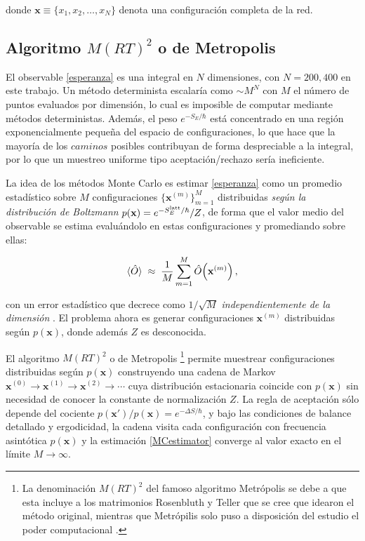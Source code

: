 \documentclass[11pt,a4paper,twoside,pdf]{article}
\numberwithin{equation}{section}
\begin{document}
donde $\mathbf{x} \equiv \{x_1, x_2, \ldots, x_N\}$ denota una configuración completa de la red.





\subsection{Algoritmo $M(RT)^2$ o de Metropolis}
\label{metropolis}


El observable \ref{esperanza} es una integral en $N$ dimensiones, con $N = 200, 400$ en este trabajo. Un método determinista escalaría como $\sim M^N$ con $M$ el número de puntos evaluados por dimensión, lo cual es imposible de computar mediante métodos deterministas. Además, el peso $e^{-S_E/\hbar}$ está concentrado en una región exponencialmente pequeña del espacio de configuraciones, lo que hace que la mayoría de los $caminos$ posibles contribuyan de forma despreciable a la integral, por lo que un muestreo uniforme tipo aceptación/rechazo sería ineficiente. \medskip


La idea de los métodos Monte Carlo es estimar \ref{esperanza} como un promedio estadístico sobre $M$ configuraciones $\{\mathbf{x}^{(m)}\}_{m=1}^{M}$ distribuidas \emph{según la distribución de Boltzmann} $p(\mathbf{x}) = e^{-S_E^{\rm latt}/\hbar}/Z$, de forma que el valor medio del observable se estima evaluándolo en estas configuraciones y promediando sobre ellas:

\begin{equation}
    \braket{\hat{O}} \;\approx\; \frac{1}{M}\sum_{m=1}^{M} \hat{O}\!\left(\mathbf{x}^{(m)}\right),
    \label{MCestimator}
\end{equation}

con un error estadístico que decrece como $1/\sqrt{M}$ \emph{independientemente de la dimensión} \cite{kalos2008monte}. El problema ahora es generar configuraciones $\mathbf{x}^{(m)}$ distribuidas según $p(\mathbf{x})$, donde además $Z$ es desconocida.\bigskip


El algoritmo $M(RT)^2$ o de Metropolis \footnote{La denominación $M(RT)^2$ del famoso algoritmo Metrópolis se debe a que esta incluye a los matrimonios Rosenbluth y Teller que se cree que idearon el método original, mientras que Metrópilis solo puso a disposición del estudio el poder computacional \cite{kalos2008monte}.} \cite{metropolis1953equation} permite muestrear configuraciones distribuidas según $p(\mathbf{x})$ construyendo una cadena de Markov $\mathbf{x}^{(0)}\to \mathbf{x}^{(1)}\to \mathbf{x}^{(2)}\to\cdots$ cuya distribución estacionaria coincide con $p(\mathbf{x})$ sin necesidad de conocer la constante de normalización $Z$. La regla de aceptación sólo depende del cociente $p(\mathbf{x}')/p(\mathbf{x}) = e^{-\Delta S/\hbar}$, y bajo las condiciones de balance detallado y ergodicidad, la cadena visita cada configuración con frecuencia asintótica $p(\mathbf{x})$ y la estimación \ref{MCestimator} converge al valor exacto en el límite $M \to \infty$.\medskip
\end{document}
